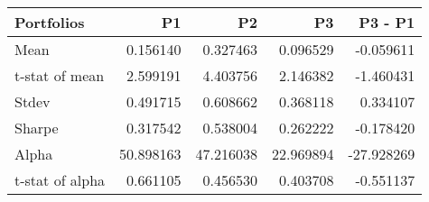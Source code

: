 \begin{tabular}{lrrrr}
\toprule
Portfolios & P1 & P2 & P3 & P3 - P1 \\
\midrule
Mean & 0.156140 & 0.327463 & 0.096529 & -0.059611 \\
t-stat of mean & 2.599191 & 4.403756 & 2.146382 & -1.460431 \\
Stdev & 0.491715 & 0.608662 & 0.368118 & 0.334107 \\
Sharpe & 0.317542 & 0.538004 & 0.262222 & -0.178420 \\
Alpha & 50.898163 & 47.216038 & 22.969894 & -27.928269 \\
t-stat of alpha & 0.661105 & 0.456530 & 0.403708 & -0.551137 \\
\bottomrule
\end{tabular}
